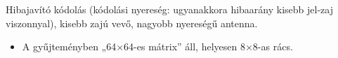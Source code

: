 Hibajavító kódolás (kódolási nyereség: ugyanakkora hibaarány kisebb jel-zaj viszonnyal), kisebb zajú vevő, nagyobb nyereségű antenna.
\begin{eredmeny}

\begin{center}\end{center}
\end{eredmeny}
\begin{tipp}[Ellenőrzés]
\begin{itemize}
\item A gyűjteményben „64$\times$64-es mátrix” áll, helyesen 8$\times$8-as rács.
\end{itemize}
\end{tipp}


